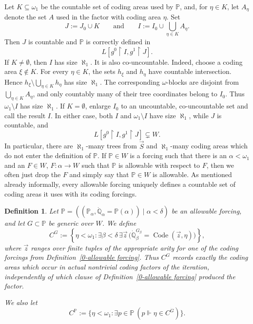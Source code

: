 \documentclass[a4paper,11pt]{article}
\newtheorem{definition}[theorem]{Definition}
\newcommand{\forceP}{\mathbb{P}}
\newcommand{\forceQ}{\mathbb{Q}}
\begin{document}
Let $K\subseteq\omega_1$ be the countable set of coding areas used by $\forceP$, and, for $\eta\in K$, let $A_\eta$ denote the set $A$ used in the factor with coding area $\eta$. Set
\[
J:=J_0\cup K
\qquad\text{and}\qquad
I:=I_0\cup\bigcup_{\eta\in K}A_\eta.
\]
Then $J$ is countable and $\forceP$ is correctly defined in
\[
L[g^0\upharpoonright I,g^1\upharpoonright J].
\]
If $K\ne\emptyset$, then $I$ has size $\aleph_1$. It is also co-uncountable. Indeed, choose a coding area $\xi\notin K$. For every $\eta\in K$, the sets $h_\xi$ and $h_\eta$ have countable intersection. Hence $h_\xi\setminus\bigcup_{\eta\in K}h_\eta$ has size $\aleph_1$. The corresponding $\omega$-blocks are disjoint from $\bigcup_{\eta\in K}A_\eta$, and only countably many of their tree coordinates belong to $I_0$. Thus $\omega_1\setminus I$ has size $\aleph_1$. If $K=\emptyset$, enlarge $I_0$ to an uncountable, co-uncountable set and call the result $I$. In either case, both $I$ and $\omega_1\setminus I$ have size $\aleph_1$, while $J$ is countable, and
\[
L[g^0\upharpoonright I,g^1\upharpoonright J]\subsetneq W.
\]
In particular, there are $\aleph_1$-many trees from $\vec S$ and $\aleph_1$-many coding areas which do not enter the definition of $\forceP$.
        If $\forceP \in W$ is a forcing such that there is an $\alpha < \omega_1$ and an $F \in W$, $F: \alpha \rightarrow W$ such that $\forceP$ is allowable with respect to $F$, then we often just drop the $F$ and simply say that $\forceP \in W$ is allowable.
    As mentioned already informally, every allowable forcing uniquely defines a countable set of coding areas it uses with its coding forcings. 
    
    \begin{definition}
    
    Let $\forceP=((\forceP_{\alpha},\dot{\forceQ}_{\alpha}=\forceP({\alpha}))\mid\alpha<\delta)$ be an allowable forcing, and let $G\subset\forceP$ be generic over $W$. We define
    \[
    C^G:=\left\{\eta<\omega_1:\exists\beta<\delta\,\exists\vec z\,
    \bigl(\dot{\forceQ}_{\beta}^{G_{\beta}}=\operatorname{Code}(\vec z,\eta)\bigr)\right\},
    \]
    where $\vec z$ ranges over finite tuples of the appropriate arity for one of the coding forcings from Definition~\ref{0-allowable forcing}. Thus $C^G$ records exactly the coding areas which occur in actual nontrivial coding factors of the iteration, independently of which clause of Definition~\ref{0-allowable forcing} produced the factor.
    
    We also let
    \[
    C^{\forceP}:=\{\eta<\omega_1:\exists p\in\forceP\ (p\Vdash\eta\in C^{\dot G})\}.
    \]
    
    \end{definition}
    
\end{document}
